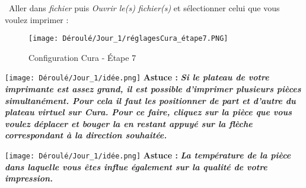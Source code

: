 \begin{flushleft}
\textbullet \, Aller dans \textit{fichier} puis \textit{Ouvrir le(s) fichier(s)} et sélectionner celui que vous voulez imprimer :
\begin{figure}[!h]
    \centering
    \texttt{[image: Déroulé/Jour\_1/réglagesCura\_étape7.PNG]}
    \caption[\'Etape 7]{Configuration Cura - \'Etape 7}
    \label{fig:my_label}
\end{figure}

\texttt{[image: Déroulé/Jour\_1/idée.png]}
\textbf{\large Astuce : }\textbf{\textit{\large Si le plateau de votre imprimante est assez grand, il est possible d'imprimer plusieurs pièces simultanément. Pour cela il faut les positionner de part et d'autre du plateau virtuel sur Cura. Pour ce faire, cliquez sur la pièce que vous voulez déplacer et bouger la en restant appuyé sur la flèche correspondant à la direction souhaitée.}}\\\vspace{0.2cm}

\texttt{[image: Déroulé/Jour\_1/idée.png]}
\textbf{\large Astuce : }\textbf{\textit{\large La température de la pièce dans laquelle vous êtes influe également sur la qualité de votre impression.}}\\
\end{flushleft}

\newpage